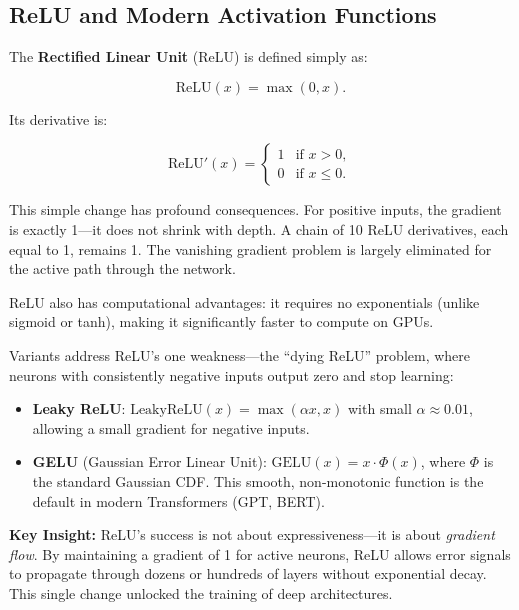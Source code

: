 \documentclass[12pt]{article}
\begin{document}

\subsection{ReLU and Modern Activation Functions}

The \textbf{Rectified Linear Unit} (ReLU) is defined simply as:

\begin{equation}
    \text{ReLU}(x) = \max(0, x).
    \label{t13eq:relu}
\end{equation}

Its derivative is:

\begin{equation}
    \text{ReLU}'(x) = \begin{cases} 
        1 & \text{if } x > 0, \\
        0 & \text{if } x \leq 0.
    \end{cases}
    \label{t13eq:relu_deriv}
\end{equation}

This simple change has profound consequences. For positive inputs, the gradient is exactly 1---it does not shrink with depth. A chain of 10 ReLU derivatives, each equal to 1, remains 1. The vanishing gradient problem is largely eliminated for the active path through the network.

ReLU also has computational advantages: it requires no exponentials (unlike sigmoid or tanh), making it significantly faster to compute on GPUs.

Variants address ReLU's one weakness---the ``dying ReLU'' problem, where neurons with consistently negative inputs output zero and stop learning:

\begin{itemize}
    \item \textbf{Leaky ReLU}: $\text{LeakyReLU}(x) = \max(\alpha x, x)$ with small $\alpha \approx 0.01$, allowing a small gradient for negative inputs.
    \item \textbf{GELU} (Gaussian Error Linear Unit): $\text{GELU}(x) = x \cdot \Phi(x)$, where $\Phi$ is the standard Gaussian CDF. This smooth, non-monotonic function is the default in modern Transformers (GPT, BERT).
\end{itemize}

\begin{alert-box}
\textbf{Key Insight:} ReLU's success is not about expressiveness---it is about \textit{gradient flow}. By maintaining a gradient of 1 for active neurons, ReLU allows error signals to propagate through dozens or hundreds of layers without exponential decay. This single change unlocked the training of deep architectures.
\end{alert-box}
\end{document}
